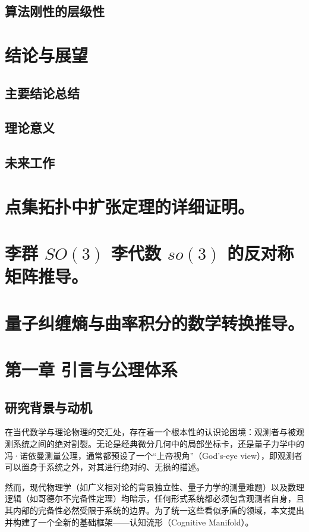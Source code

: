 \documentclass[11pt,a4paper]{article}
\begin{document}
\subsection{算法刚性的层级性}

\section{结论与展望}
\subsection{主要结论总结}
\subsection{理论意义}
\subsection{未来工作}

\appendix
\section{点集拓扑中扩张定理的详细证明。}
\section{李群 \(SO(3)\) 李代数 \(so(3)\) 的反对称矩阵推导。}
\section{量子纠缠熵与曲率积分的数学转换推导。}


\clearpage
\section{第一章 引言与公理体系}
\subsection{研究背景与动机}
在当代数学与理论物理的交汇处，存在着一个根本性的认识论困境：观测者与被观测系统之间的绝对割裂。无论是经典微分几何中的局部坐标卡，还是量子力学中的冯·诺依曼测量公理，通常都预设了一个“上帝视角”（God's-eye view），即观测者可以置身于系统之外，对其进行绝对的、无损的描述。

然而，现代物理学（如广义相对论的背景独立性、量子力学的测量难题）以及数理逻辑（如哥德尔不完备性定理）均暗示，任何形式系统都必须包含观测者自身，且其内部的完备性必然受限于系统的边界。为了统一这些看似矛盾的领域，本文提出并构建了一个全新的基础框架——认知流形（Cognitive Manifold）。
\end{document}
